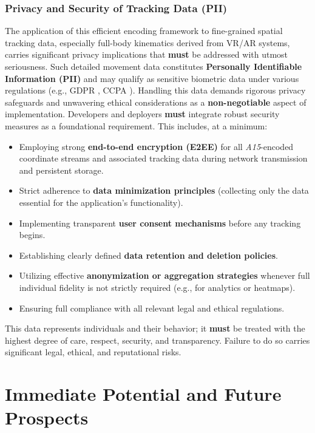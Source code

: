 \documentclass[10pt]{article}
\def\AAAB{\textit{A15}}
\begin{document}
\subsubsection{Privacy and Security of Tracking Data (PII)}\label{subsubsec-limits-privacy}
The application of this efficient encoding framework to fine-grained spatial tracking data, especially full-body kinematics derived from VR/AR systems, carries significant privacy implications that \textbf{must} be addressed with utmost seriousness. Such detailed movement data constitutes \textbf{Personally Identifiable Information (PII)} and may qualify as sensitive biometric data under various regulations (e.g., GDPR \cite{GDPR-2016}, CCPA \cite{CCPA-2018}). Handling this data demands rigorous privacy safeguards and unwavering ethical considerations as a \textbf{non-negotiable} aspect of implementation. Developers and deployers \textbf{must} integrate robust security measures as a foundational requirement. This includes, at a minimum:
\begin{itemize} \itemsep0pt
    \item Employing strong \textbf{end-to-end encryption (E2EE)} for all \AAAB{}-encoded coordinate streams and associated tracking data during network transmission and persistent storage.
    \item Strict adherence to \textbf{data minimization principles} (collecting only the data essential for the application's functionality).
    \item Implementing transparent \textbf{user consent mechanisms} before any tracking begins.
    \item Establishing clearly defined \textbf{data retention and deletion policies}.
    \item Utilizing effective \textbf{anonymization or aggregation strategies} whenever full individual fidelity is not strictly required (e.g., for analytics or heatmaps).
    \item Ensuring full compliance with all relevant legal and ethical regulations.
\end{itemize}
This data represents individuals and their behavior; it \textbf{must} be treated with the highest degree of care, respect, security, and transparency. Failure to do so carries significant legal, ethical, and reputational risks.

\section{Immediate Potential and Future Prospects}\label{sec-outlook}
\end{document}
